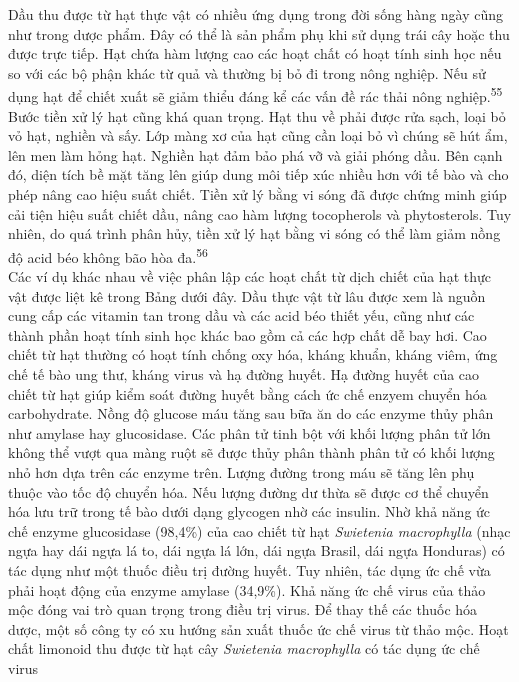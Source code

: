 \documentclass[
  letterpaper,
  DIV=11,
  numbers=noendperiod]{scrartcl}
\begin{document}
Dầu thu được từ hạt thực vật có nhiều ứng dụng trong đời sống hàng ngày
cũng như trong dược phẩm. Đây có thể là sản phẩm phụ khi sử dụng trái
cây hoặc thu được trực tiếp. Hạt chứa hàm lượng cao các hoạt chất có
hoạt tính sinh học nếu so với các bộ phận khác từ quả và thường bị bỏ đi
trong nông nghiệp. Nếu sử dụng hạt để chiết xuất sẽ giảm thiểu đáng kể
các vấn đề rác thải nông nghiệp.\textsuperscript{55} Bước tiền xử lý hạt
cũng khá quan trọng. Hạt thu về phải được rửa sạch, loại bỏ vỏ hạt,
nghiền và sấy. Lớp màng xơ của hạt cũng cần loại bỏ vì chúng sẽ hút ẩm,
lên men làm hỏng hạt. Nghiền hạt đảm bảo phá vỡ và giải phóng dầu. Bên
cạnh đó, diện tích bề mặt tăng lên giúp dung môi tiếp xúc nhiều hơn với
tế bào và cho phép nâng cao hiệu suất chiết. Tiền xử lý bằng vi sóng đã
được chứng minh giúp cải tiện hiệu suất chiết dầu, nâng cao hàm lượng
tocopherols và phytosterols. Tuy nhiên, do quá trình phân hủy, tiền xử
lý hạt bằng vi sóng có thể làm giảm nồng độ acid béo không bão hòa
đa.\textsuperscript{56}\\
Các ví dụ khác nhau về việc phân lập các hoạt chất từ dịch chiết của hạt
thực vật được liệt kê trong Bảng dưới đây. Dầu thực vật từ lâu được xem
là nguồn cung cấp các vitamin tan trong dầu và các acid béo thiết yếu,
cũng như các thành phần hoạt tính sinh học khác bao gồm cả các hợp chất
dễ bay hơi. Cao chiết từ hạt thường có hoạt tính chống oxy hóa, kháng
khuẩn, kháng viêm, ứng chế tế bào ung thư, kháng virus và hạ đường
huyết. Hạ đường huyết của cao chiết từ hạt giúp kiểm soát đường huyết
bằng cách ức chế enzyem chuyển hóa carbohydrate. Nồng độ glucose máu
tăng sau bữa ăn do các enzyme thủy phân như amylase hay glucosidase. Các
phân tử tinh bột với khối lượng phân tử lớn không thể vượt qua màng ruột
sẽ được thủy phân thành phân tử có khối lượng nhỏ hơn dựa trên các
enzyme trên. Lượng đường trong máu sẽ tăng lên phụ thuộc vào tốc độ
chuyển hóa. Nếu lượng đường dư thừa sẽ được cơ thể chuyển hóa lưu trữ
trong tế bào dưới dạng glycogen nhờ các insulin. Nhờ khả năng ức chế
enzyme glucosidase (98,4\%) của cao chiết từ hạt \emph{Swietenia
macrophylla} (nhạc ngựa hay dái ngựa lá to, dái ngựa lá lớn, dái ngựa
Brasil, dái ngựa Honduras) có tác dụng như một thuốc điều trị đường
huyết. Tuy nhiên, tác dụng ức chế vừa phải hoạt động của enzyme amylase
(34,9\%). Khả năng ức chế virus của thảo mộc đóng vai trò quan trọng
trong điều trị virus. Để thay thế các thuốc hóa dược, một số công ty có
xu hướng sản xuất thuốc ức chế virus từ thảo mộc. Hoạt chất limonoid thu
được từ hạt cây \emph{Swietenia macrophylla} có tác dụng ức chế virus
\end{document}
